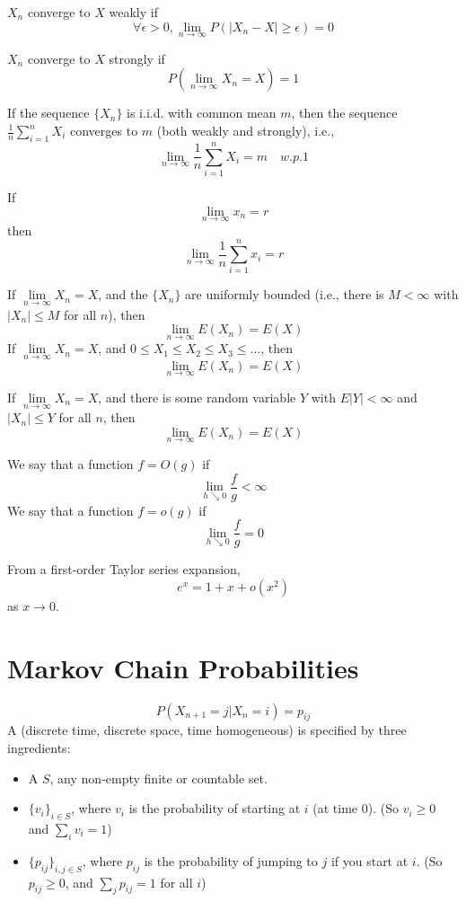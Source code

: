 \documentclass[11pt]{article}
\renewcommand{\limit}[1]{\underset{{#1} \rightarrow \infty}{\lim}}
\begin{document}
    $X_n$ converge to $X$ weakly if 
    $$\forall \epsilon > 0, \limit{n}P(|X_n - X| \geq \epsilon) = 0$$
   
    $X_n$ converge to $X$ strongly if 
    $$P(\limit{n}X_n = X) = 1$$ 
    
    If the sequence $\{X_n\}$ is i.i.d. with common mean $m$, then the sequence $\frac{1}{n}\sum_{i=1}^n X_i$ converges to $m$ (both weakly and strongly), i.e.,
    $$\limit{n} \frac{1}{n}\sum_{i=1}^nX_i = m \quad w.p. 1$$ 
    
  	If $$\limit{n} x_n = r$$then $$\limit{n} \frac{1}{n}\sum_{i=1}^n x_i = r$$
  	
  	If $\limit{n} X_n = X$, and the $\{X_n\}$ are uniformly bounded (i.e., there is $M < \infty$ with $|X_n| \leq M$ for all $n$), then
  	$$\limit{n}E(X_n) = E(X)$$
  	 If $\limit{n}X_n = X$, and $0 \leq X_1 \leq X_2 \leq X_3 \leq \hdots$, then
  	$$\limit{n}E(X_n) = E(X)$$
  	
    If $\limit{n} X_n = X$, and there is some random variable $Y$ with $E|Y|<\infty$ and $|X_n| \leq Y$ for all $n$, then $$\limit{n} E(X_n) = E(X)$$
    
    We say that a function $f = O(g)$ if 
    $$\underset{h \searrow 0}{\lim} \frac{f}{g} < \infty$$
    We say that a function $f = o(g)$ if
    $$\underset{h \searrow 0}{\lim} \frac{f}{g} = 0$$
    
    \example From a first-order Taylor series expansion,
    $$e^x = 1 + x + o(x^2)$$
    as $x \rightarrow 0$.
    

    \section{Markov Chain Probabilities}
    \notation
    $$P(X_{n+1} = j | X_n = i) = p_{ij}$$
     A (discrete time, discrete space, time homogeneous)  is specified by three ingredients:
    \begin{itemize}
    	\item A  $S$, any non-empty finite or countable set.
    	\item {} $\{v_i\}_{i \in S}$, where $v_i$ is the probability of starting at $i$ (at time 0). (So $v_i \geq 0$ and $\sum_i v_i = 1$)
    	\item {} $\{p_{ij}\}_{i, j\in S}$, where $p_{ij}$ is the probability of jumping to $j$ if you start at $i$. (So $p_{ij} \geq 0$, and $\sum_j p_{ij} = 1$ for all $i$)
    \end{itemize}
    
\end{document}
